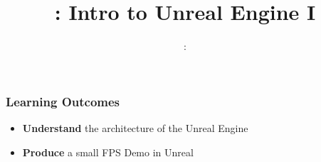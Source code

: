 \usepackage{../../beamerthemeFalmouthGamesAcademy}
\usepackage{multimedia}
\graphicspath{ {../../} }

\usepackage{textcomp}


\usepackage[normalem]{ulem}
\usepackage{wasysym}

\usepackage{pdfpages}

\usetikzlibrary{arrows,automata}







\title{\sessionnumber: Intro to Unreal Engine I}
\subtitle{\modulecode: \moduletitle}

\frame{\titlepage} 

\begin{frame}
	\frametitle{Learning Outcomes}
	\begin{itemize}
		\item \textbf{Understand} the architecture of the Unreal Engine
		\item \textbf{Produce} a small FPS Demo in Unreal
	\end{itemize}
\end{frame}

